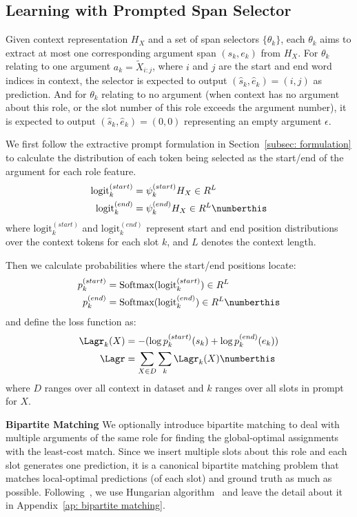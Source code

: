 \subsection{Learning with Prompted Span Selector}
Given context representation $H_X$ and a set of span selectors $\{\theta_k\}$, each $\theta_k$ aims to extract at most one corresponding argument span $(s_k, e_k)$ from $H_X$. For $\theta_k$ relating to one argument $a_k = \tilde{X}_{i:j}$, where $i$ and $j$ are the start and end word indices in context, the selector is expected to output $(\hat{s}_k, \hat{e}_k) = (i, j)$ as prediction. And for $\theta_k$ relating to no argument (when context has no argument about this role, or the slot number of this role exceeds the argument number), it is expected to output $(\hat{s}_k, \hat{e}_k) = (0, 0)$ representing an empty argument $\epsilon$.

We first follow the extractive prompt formulation in Section~\ref{subsec: formulation} to calculate the distribution of each token being selected as the start/end of the argument for each role feature.
\begin{align*} 
\text{logit}_{k}^{(start)} &= \psi_{k}^{(start)} H_X \in R^L \\ 
\text{logit}_{k}^{(end)} &= \psi_{k}^{(end)} H_X \in R^L \numberthis
\label{eq: logit}
\end{align*}
where $\text{logit}_{k}^{(start)}$ and $\text{logit}_{k}^{(end)}$ represent start and end position distributions over the context tokens for each slot $k$, and $L$ denotes the context length.

Then we calculate probabilities where the start/end positions locate:
\begin{align*}
    p_k^{(start)} &= \text{Softmax}(\text{logit}_{k}^{(start)}) \in R^L \\
    p_k^{(end)} &= \text{Softmax}(\text{logit}_{k}^{(end)}) \in R^L 
\numberthis
\label{eq: softmax without bipartite}
\end{align*}
and define the loss function as:
\begin{align*}
 \Lagr_{k}(X) & = - (\log p_{k}^{(start)}(s_{k}) + \log p_{k}^{(end)}(e_{k})) \\
 \Lagr & = \sum_{X \in D}\sum_{k} \Lagr_{k}(X)
\label{eq: loss}
\numberthis
\end{align*}
where $D$ ranges over all context in dataset and $k$ ranges over all slots in prompt for $X$.

\noindent\textbf{Bipartite Matching}
We optionally introduce bipartite matching to deal with multiple arguments of the same role for finding the global-optimal assignments with the least-cost match. Since we insert multiple slots about this role and each slot generates one prediction, it is a canonical bipartite matching problem that matches local-optimal predictions (of each slot) and ground truth as much as possible. Following~\citet{Carion-etal-2020-detr, yang-etal-2021-document}, we use Hungarian algorithm~\cite{kuhn1955hungarian} and leave the detail about it in Appendix~\ref{ap: bipartite matching}.

